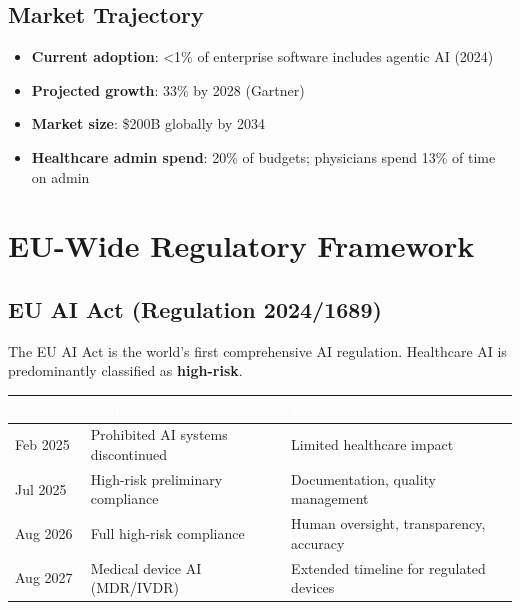 \documentclass[11pt,a4paper]{article}
\begin{document}
\subsection{Market Trajectory}

\begin{itemize}
    \item \textbf{Current adoption}: <1\% of enterprise software includes agentic AI (2024)
    \item \textbf{Projected growth}: 33\% by 2028 (Gartner)
    \item \textbf{Market size}: \$200B globally by 2034
    \item \textbf{Healthcare admin spend}: 20\% of budgets; physicians spend 13\% of time on admin
\end{itemize}

\section{EU-Wide Regulatory Framework}

\subsection{EU AI Act (Regulation 2024/1689)}

The EU AI Act is the world's first comprehensive AI regulation. Healthcare AI is predominantly classified as \textbf{high-risk}.

\begin{center}
\begin{tabular}{L{3cm}L{4.5cm}L{5.5cm}}
\toprule
{}
\textcolor{white}{\textbf{Deadline}} & \textcolor{white}{\textbf{Requirement}} & \textcolor{white}{\textbf{Healthcare Impact}} \\
\midrule
Feb 2025 & Prohibited AI systems discontinued & Limited healthcare impact \\
Jul 2025 & High-risk preliminary compliance & Documentation, quality management \\
Aug 2026 & Full high-risk compliance & Human oversight, transparency, accuracy \\
Aug 2027 & Medical device AI (MDR/IVDR) & Extended timeline for regulated devices \\
\bottomrule
\end{tabular}
\end{center}
\end{document}
